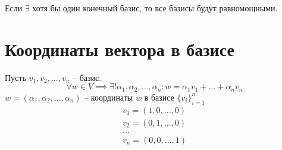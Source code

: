 \documentclass[main]{subfiles}
\begin{document}
Если $\exists$ хотя бы один конечный базис, то все базисы будут равномощными.

\section{Координаты вектора в базисе}
Пусть $v_1, v_2, ..., v_n$ -- базис.
\[\forall w \in V \implies \exists ! \alpha_1, \alpha_2, ..., \alpha_n:
    w = \alpha_1 v_1 + ... + \alpha_n v_n\]
$w = (\alpha_1, \alpha_2, ..., \alpha_n)$ -- координаты $w$ в базисе $\{v_i\}_{i=1}^n$
\begin{gather*}
    v_1 = (1, 0, ..., 0)\\
    v_2 = (0, 1, ..., 0)\\
    ...\\
    v_n = (0, 0, ..., 1)
\end{gather*}
\end{document}

